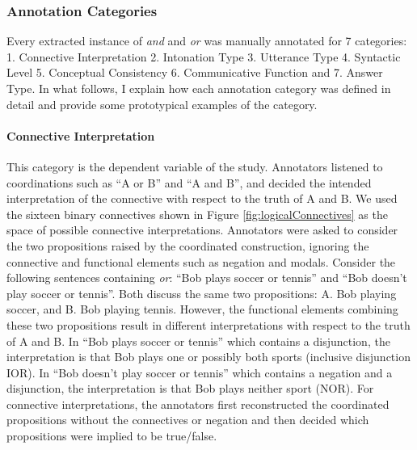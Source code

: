 \documentclass[floatsintext,man]{apa6}
\theoremstyle{definition}
\theoremstyle{definition}
\theoremstyle{definition}
\theoremstyle{remark}
\begin{document}
\subsubsection{Annotation Categories}\label{annotation-categories}

Every extracted instance of \emph{and} and \emph{or} was manually
annotated for 7 categories: 1. Connective Interpretation 2. Intonation
Type 3. Utterance Type 4. Syntactic Level 5. Conceptual Consistency 6.
Communicative Function and 7. Answer Type. In what follows, I explain
how each annotation category was defined in detail and provide some
prototypical examples of the category.

\paragraph{Connective Interpretation}\label{connective-interpretation}

This category is the dependent variable of the study. Annotators
listened to coordinations such as \enquote{A or B} and \enquote{A and
B}, and decided the intended interpretation of the connective with
respect to the truth of A and B. We used the sixteen binary connectives
shown in Figure \ref{fig:logicalConnectives} as the space of possible
connective interpretations. Annotators were asked to consider the two
propositions raised by the coordinated construction, ignoring the
connective and functional elements such as negation and modals. Consider
the following sentences containing \emph{or}: \enquote{Bob plays soccer
or tennis} and \enquote{Bob doesn't play soccer or tennis}. Both discuss
the same two propositions: A. Bob playing soccer, and B. Bob playing
tennis. However, the functional elements combining these two
propositions result in different interpretations with respect to the
truth of A and B. In \enquote{Bob plays soccer or tennis} which contains
a disjunction, the interpretation is that Bob plays one or possibly both
sports (inclusive disjunction IOR). In \enquote{Bob doesn't play soccer
or tennis} which contains a negation and a disjunction, the
interpretation is that Bob plays neither sport (NOR). For connective
interpretations, the annotators first reconstructed the coordinated
propositions without the connectives or negation and then decided which
propositions were implied to be true/false.
\end{document}
